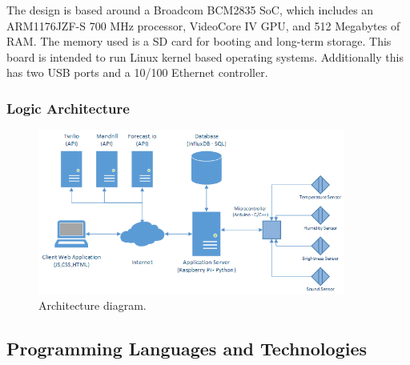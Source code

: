 \documentclass[12pt]{report}
\begin{document}
The design is based around a Broadcom BCM2835 SoC, which includes an ARM1176JZF-S 700 MHz processor, VideoCore IV GPU, and 512 Megabytes of RAM. The memory used is a SD card for booting and long-term storage. This board is intended to run Linux kernel based operating systems. Additionally this has two USB ports and a 10/100 Ethernet controller.

\subsubsection{Logic Architecture}

\begin{figure}[H]
    \centering
    \includegraphics[width=0.9\textwidth]{arc.png}
    \caption{Architecture diagram.}
    \label{fig:arc}
\end{figure}

\subsection{Programming Languages and Technologies}
\end{document}
